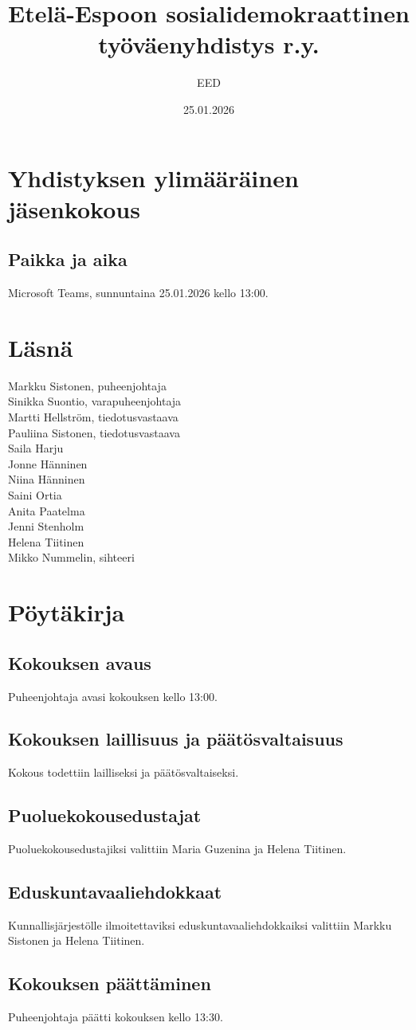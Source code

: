 \documentclass[a4paper,12pt]{article}
\title{Etelä-Espoon sosialidemokraattinen työväenyhdistys r.y.}
\author{EED}
\date{25.01.2026}
\begin{document}
\maketitle
\tableofcontents
\section*{Yhdistyksen ylimääräinen jäsenkokous}
\subsection*{Paikka ja aika}
Microsoft Teams, sunnuntaina 25.01.2026 kello 13:00.
\section*{Läsnä}
Markku Sistonen, puheenjohtaja \\
Sinikka Suontio, varapuheenjohtaja \\
Martti Hellström, tiedotusvastaava \\
Pauliina Sistonen, tiedotusvastaava \\
Saila Harju \\
Jonne Hänninen \\
Niina Hänninen \\
Saini Ortia \\
Anita Paatelma \\
Jenni Stenholm \\
Helena Tiitinen \\
Mikko Nummelin, sihteeri
\section*{Pöytäkirja}
\subsection{Kokouksen avaus}
Puheenjohtaja avasi kokouksen kello 13:00.
\subsection{Kokouksen laillisuus ja päätösvaltaisuus}
Kokous todettiin lailliseksi ja päätösvaltaiseksi.
\subsection{Puoluekokousedustajat}
Puoluekokousedustajiksi valittiin Maria Guzenina ja Helena Tiitinen.
\subsection{Eduskuntavaaliehdokkaat}
Kunnallisjärjestölle ilmoitettaviksi eduskuntavaaliehdokkaiksi valittiin Markku Sistonen ja Helena Tiitinen.
\subsection{Kokouksen päättäminen}
Puheenjohtaja päätti kokouksen kello 13:30.
\end{document}
